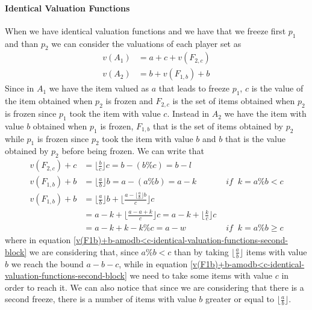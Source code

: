\documentclass{article}
\begin{document}
\paragraph{Identical Valuation Functions}
When we have identical valuation functions and we have that we freeze first $p_1$ and than $p_2$ we can consider the valuations of each player set as 
\begin{align}
    v(A_1) & = a + c + v(F_{2,c})\\
    v(A_2) & = b + v(F_{1,b}) + b
\end{align}
Since in $A_1$ we have the item valued as $a$ that leads to freeze $p_1$, $c$ is the value of the item obtained when $p_2$ is frozen and $F_{2,c}$ is the set of items obtained when $p_2$ is frozen since $p_1$ took the item with value $c$. Instead in $A_2$ we have the item with value $b$ obtained when $p_1$ is frozen, $F_{1,b}$ that is the set of items obtained by $p_2$ while $p_1$ is frozen since $p_2$ took the item with value $b$ and $b$ that is the value obtained by $p_2$ before being frozen.
We can write that 
\begin{align}
    v(F_{2,c}) + c &= \lfloor \frac{b}{c}\rfloor c = b - (b\% c) = b-l \label{v(F2c)+c-identical-valuation-functions-second-block}\\
    v(F_{1,b}) + b &= \lfloor \frac{a}{b}\rfloor b = a - (a\% b) = a - k  &\textit{ if } \:k = a\% b < c \label{v(F1b)+b-amodb<c-identical-valuation-functions-second-block}\\
    v(F_{1,b}) + b &=\lfloor \frac{a}{b}\rfloor b + \lfloor \frac{a - \lfloor \frac{a}{b}\rfloor b }{c} \rfloor c \label{v(F1b)+b-amodb>c-identical-valuation-functions-second-block} \\&= a-k + \lfloor \frac{a- a + k }{c} \rfloor c = a - k + \lfloor \frac{k}{c} \rfloor c \\&= a - k + k - k\% c  = a - w &\textit{ if } \:k = a\% b \ge c
\end{align}
where in equation \ref{v(F1b)+b-amodb<c-identical-valuation-functions-second-block} we are considering that, since $a\% b < c$ than by taking $\lfloor\frac{a}{b}\rfloor$ items with value $b$ we reach the bound $a-b-c$, while in equation \ref{v(F1b)+b-amodb<c-identical-valuation-functions-second-block} we need to take some items with value $c$ in order to reach it. We can also notice that since we are considering that there is a second freeze, there is a number of items with value $b$ greater or equal to $\lfloor\frac{a}{b}\rfloor$. 
\end{document}
